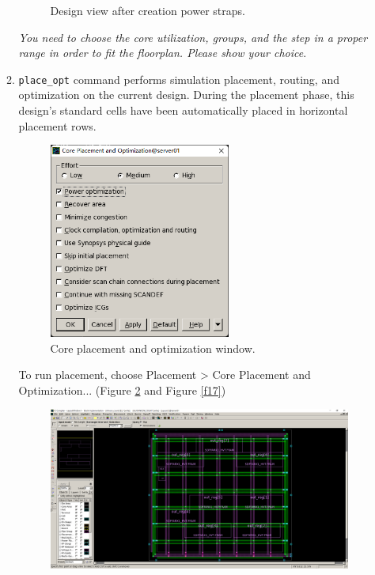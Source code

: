 \documentclass[a4paper,12pt,twoside]{article}
\begin{document}
\begin{enumerate}
\begin{enumerate}
\begin{figure}[H]
            \caption{Design view after creation power straps.}
            \label{f14}
        \end{figure}
        \textit{You need to choose the core utilization, groups, and the step in a proper range in order to fit the floorplan. Please show your choice}.
        \item \texttt{place\_opt} command performs simulation placement, routing, and optimization on the current design. During the placement phase, this design's standard cells have been automatically placed in horizontal placement rows.
        \begin{figure}[H]
            \centering
            \includegraphics[width=0.6\textwidth]{images/15.png}
            \caption{Core placement and optimization window.}
            \label{f15}
        \end{figure}
        To run placement, choose Placement > Core Placement and Optimization... (Figure \ref{f15} and Figure \ref{f17})
        \begin{figure}[H]
            \centering
            \includegraphics[width=\textwidth]{images/17.png}

\end{figure}
\end{enumerate}
\end{enumerate}
\end{document}
